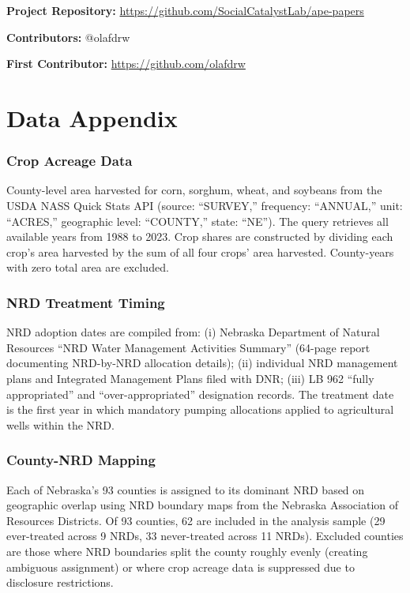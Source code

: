 \documentclass[12pt]{article}
\begin{document}
\noindent\textbf{Project Repository:} \url{https://github.com/SocialCatalystLab/ape-papers}

\noindent\textbf{Contributors:} @olafdrw

\noindent\textbf{First Contributor:} \url{https://github.com/olafdrw}

\label{apep_main_text_end}
\newpage


\newpage
\appendix

\section{Data Appendix}

\subsubsection*{Crop Acreage Data} County-level area harvested for corn, sorghum, wheat, and soybeans from the USDA NASS Quick Stats API (source: ``SURVEY,'' frequency: ``ANNUAL,'' unit: ``ACRES,'' geographic level: ``COUNTY,'' state: ``NE''). The query retrieves all available years from 1988 to 2023. Crop shares are constructed by dividing each crop's area harvested by the sum of all four crops' area harvested. County-years with zero total area are excluded.

\subsubsection*{NRD Treatment Timing} NRD adoption dates are compiled from: (i) Nebraska Department of Natural Resources ``NRD Water Management Activities Summary'' (64-page report documenting NRD-by-NRD allocation details); (ii) individual NRD management plans and Integrated Management Plans filed with DNR; (iii) LB 962 ``fully appropriated'' and ``over-appropriated'' designation records. The treatment date is the first year in which mandatory pumping allocations applied to agricultural wells within the NRD.

\subsubsection*{County-NRD Mapping} Each of Nebraska's 93 counties is assigned to its dominant NRD based on geographic overlap using NRD boundary maps from the Nebraska Association of Resources Districts. Of 93 counties, 62 are included in the analysis sample (29 ever-treated across 9 NRDs, 33 never-treated across 11 NRDs). Excluded counties are those where NRD boundaries split the county roughly evenly (creating ambiguous assignment) or where crop acreage data is suppressed due to disclosure restrictions.
\end{document}
